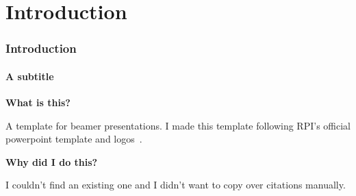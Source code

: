 \documentclass[
	10pt, %
	aspectratio=169, %
]{beamer}
\begin{document}

\section{Introduction}
\begin{frame}
	\frametitle{Introduction} %
	\framesubtitle{A subtitle}
	{
		\Large \bf
		What is this?
	}

	A template for beamer presentations.
	I made this template following RPI's official powerpoint template and logos~\cite{rpiHomeStrategicCommunications}.

	\vspace{1cm}
	{
		\Large \bf
		Why did I do this?
	}

	I couldn't find an existing one and I didn't want to copy over citations manually.

\end{frame}
\end{document}
